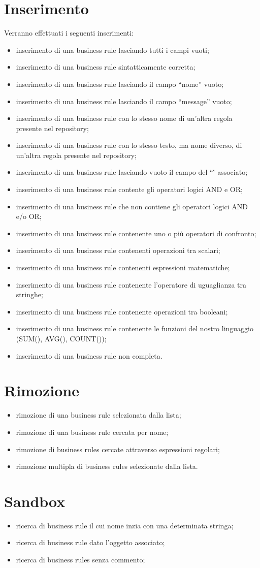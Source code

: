 \chapter{Inserimento}
Verranno effettuati i seguenti inserimenti:
\begin{itemize}
\item inserimento di una business rule lasciando tutti i campi vuoti;
\item inserimento di una business rule sintatticamente corretta;
\item inserimento di una business rule lasciando il campo ``nome'' vuoto;
\item inserimento di una business rule lasciando il campo ``message'' vuoto;
\item inserimento di una business rule con lo stesso nome di un'altra regola presente nel repository;
\item inserimento di una business rule con lo stesso testo, ma nome diverso, di un'altra regola presente nel repository;
\item inserimento di una business rule lasciando vuoto il campo del ``\bo\'' associato;
\item inserimento di una business rule contente gli operatori logici AND e OR;
\item inserimento di una business rule che non contiene gli operatori logici AND e/o OR;
\item inserimento di una business rule contenente uno o pi\`u operatori di confronto;
\item inserimento di una business rule contenenti operazioni tra scalari;
\item inserimento di una business rule contenenti espressioni matematiche;
\item inserimento di una business rule contenente l'operatore di uguaglianza tra stringhe;
\item inserimento di una business rule contenente operazioni tra booleani;
\item inserimento di una business rule contenente le funzioni del nostro linguaggio (SUM(), AVG(), COUNT());
\item inserimento di una business rule non completa.
\end{itemize}
\chapter{Rimozione}
\begin{itemize}
\item rimozione di una business rule selezionata dalla lista;
\item rimozione di una business rule cercata per nome;
\item rimozione di business rules cercate attraverso espressioni regolari;
\item rimozione multipla di business rules selezionate dalla lista.
\end{itemize}
\chapter{Sandbox}
\begin{itemize}
\item ricerca di business rule il cui nome inzia con una determinata stringa; 
\item ricerca di business rule dato l'oggetto associato;
\item ricerca di business rules senza commento;
\end{itemize}



